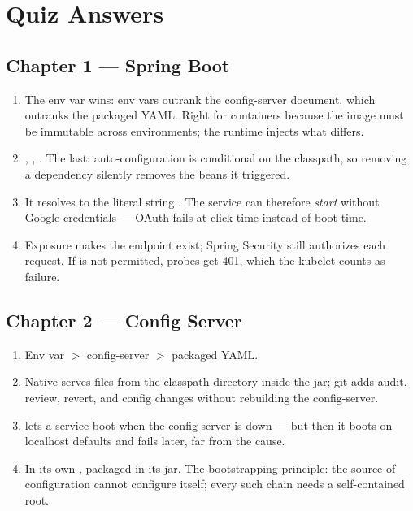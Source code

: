 \chapter{Quiz Answers}
\label{app:answers}

\section*{Chapter 1 --- Spring Boot}
\begin{enumerate}
  \item The env var wins: env vars outrank the config-server document,
  which outranks the packaged YAML. Right for containers because the
  image must be immutable across environments; the runtime injects
  what differs.
  \item {}, ,
  . The last: auto-configuration is
  conditional on the classpath, so removing a dependency silently
  removes the beans it triggered.
  \item It resolves to the literal string . The
  service can therefore \emph{start} without Google credentials ---
  OAuth fails at click time instead of boot time.
  \item Exposure makes the endpoint exist; Spring Security still
  authorizes each request. If  is not permitted,
  probes get 401, which the kubelet counts as failure.
\end{enumerate}

\section*{Chapter 2 --- Config Server}
\begin{enumerate}
  \item Env var $>$ config-server $>$ packaged YAML.
  \item Native serves files from the classpath directory inside the
  jar; git adds audit, review, revert, and config changes without
  rebuilding the config-server.
  \item {} lets a service boot when the config-server is
  down --- but then it boots on localhost defaults and fails later,
  far from the cause.
  \item In its own , packaged in its jar. The
  bootstrapping principle: the source of configuration cannot
  configure itself; every such chain needs a self-contained root.
\end{enumerate}

